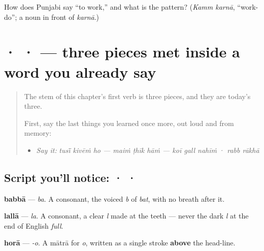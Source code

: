 \begin{tcolorbox}[breakable,colback=teal!4,colframe=teal!35!black,title={Before you move on}]
How does Punjabi say \textquotedblleft{}to work,\textquotedblright{} and what is the pattern? (\emph{Kamm karnā}, \textquotedblleft{}work-do\textquotedblright{}; a noun in front of \emph{karnā}.)
\end{tcolorbox}
\section[\texorpdfstring{\pa{ਬ} · \pa{ਲ} · \pa{ੋ} (ba · la · -o)}{ਬ · ਲ · ੋ (ba · la · -o)}]{ ·  ·  — three pieces met inside a word you already say}

\label{lesson:PA-S05-babba-lalla-hora}



\begin{quote}
The stem of this chapter's first verb is three pieces, and they are today's three.

First, say the last things you learned once more, out loud and from memory:

\begin{itemize}
\raggedright
  \item \emph{Say it:} \emph{tusī̃ kivēṁ ho — maiṁ ṭhīk hāṁ — koī gall nahīṁ} · \emph{rabb rākhā}
\end{itemize}
\end{quote}

\subsection*{Script you'll notice:  ·  · }
\begin{quote}
\end{quote}

\textbf{babbā} — \emph{ba}. A consonant, the voiced \emph{b} of \emph{bat}, with no breath after it.

\begin{quote}
\end{quote}

\textbf{lallā} — \emph{la}. A consonant, a clear \emph{l} made at the teeth — never the dark \emph{l} at the end of English \emph{full}.

\begin{quote}
\end{quote}

\textbf{horā} — \emph{-o}. A mātrā for \emph{o}, written as a single stroke \textbf{above} the head-line.

